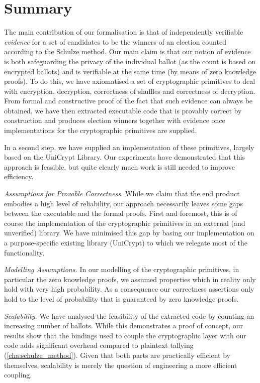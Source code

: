 \section{Summary}
\label{sec:summary}

\noindent The main contribution of our formalisation is that of independently
verifiable \emph{evidence} for a set of candidates to be the winners
of an election counted according to the Schulze method. Our main
claim is that our notion of evidence is both safeguarding the
privacy of the individual ballot (as the count is based on encrypted
ballots) and is verifiable at the same time (by means of zero
knowledge proofs). To do this, we have axiomatised a set of
cryptographic primitives to deal with encryption, decryption,
correctness of shuffles and correctness of decryption. From formal
and constructive proof of the fact that such evidence can always be
obtained, we have then extracted executable code that is provably
correct by construction and produces election winners together with
evidence once implementations for the cryptographic primitives are
supplied.

In a second step, we have supplied an implementation of these
primitives, largely based on the UniCrypt Library. Our experiments
have demonstrated that this approach is feasible, but quite clearly
much work is still needed to improve efficiency. 

\smallskip\noindent\emph{Assumptions for Provable Correctness.}
While we claim that the end product embodies a high level of
reliability, our approach necessarily leaves some gaps between the
executable and the formal proofs. First and foremost, this is of
course the implementation of the cryptographic primitives in an
external (and unverified) library. We have minimised this gap by
basing our implementation on a purpose-specific existing library
(UniCrypt) to which we relegate most of the functionality. 


\smallskip\noindent\emph{Modelling Assumptions.} In our modelling of
the cryptographic primitives, in particular the zero knowledge
proofs, we assumed properties which in reality only hold with
very high probability. As a
consequence our correctness assertions only hold to the level
of probability that is guaranteed by zero knowledge proofs.

\smallskip\noindent\emph{Scalability.} We have analysed the
feasibility of the extracted code by counting an increasing number
of ballots. While this demonstrates a proof of concept, our results
show that the bindings used to couple the cryptographic layer with
our code adds significant overhead compared
to plaintext tallying (\ref{cha:schulze_method}). Given that both
parts are practically efficient by themselves, scalability is merely
the question of engineering a more efficient coupling. 


